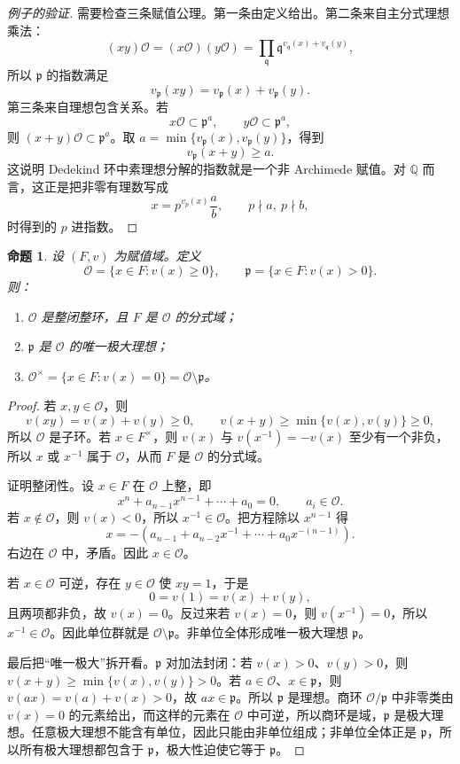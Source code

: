 \documentclass[11pt,a4paper,openany]{ctexbook}
\numberwithin{equation}{chapter}
\newcommand{\Q}{\mathbb{Q}}
\theoremstyle{plain}
\newtheorem{proposition}[theorem]{命题}
\theoremstyle{definition}
\theoremstyle{remark}
\begin{document}
\begin{proof}[例子的验证]
需要检查三条赋值公理。第一条由定义给出。第二条来自主分式理想乘法：
\[
(xy)\mathcal O=(x\mathcal O)(y\mathcal O)
=\prod_{\mathfrak q}\mathfrak q^{v_{\mathfrak q}(x)+v_{\mathfrak q}(y)},
\]
所以 $\mathfrak p$ 的指数满足
\[
v_{\mathfrak p}(xy)=v_{\mathfrak p}(x)+v_{\mathfrak p}(y).
\]
第三条来自理想包含关系。若
\[
x\mathcal O\subset \mathfrak p^a,\qquad y\mathcal O\subset \mathfrak p^a,
\]
则 $(x+y)\mathcal O\subset \mathfrak p^a$。取
$a=\min\{v_{\mathfrak p}(x),v_{\mathfrak p}(y)\}$，得到
\[
v_{\mathfrak p}(x+y)\ge a.
\]
这说明 Dedekind 环中素理想分解的指数就是一个非 Archimede 赋值。对
\(\Q\) 而言，这正是把非零有理数写成
\[
x=p^{v_p(x)}\frac ab,\qquad p\nmid a,\ p\nmid b,
\]
时得到的 $p$ 进指数。
\end{proof}

\begin{proposition}
设 $(F,v)$ 为赋值域。定义
\[
\mathcal O=\{x\in F:v(x)\ge0\},\qquad
\mathfrak p=\{x\in F:v(x)>0\}.
\]
则：
\begin{enumerate}[label=(\arabic*)]
\item $\mathcal O$ 是整闭整环，且 $F$ 是 $\mathcal O$ 的分式域；
\item $\mathfrak p$ 是 $\mathcal O$ 的唯一极大理想；
\item $\mathcal O^\times=\{x\in F:v(x)=0\}=\mathcal O\setminus\mathfrak p$。
\end{enumerate}
\end{proposition}

\begin{proof}
若 $x,y\in\mathcal O$，则
\[
v(xy)=v(x)+v(y)\ge0,\qquad
v(x+y)\ge\min\{v(x),v(y)\}\ge0,
\]
所以 $\mathcal O$ 是子环。若 $x\in F^\times$，则 $v(x)$ 与 $v(x^{-1})=-v(x)$ 至少有一个非负，所以 $x$ 或 $x^{-1}$ 属于 $\mathcal O$，从而 $F$ 是 $\mathcal O$ 的分式域。

证明整闭性。设 $x\in F$ 在 $\mathcal O$ 上整，即
\[
x^n+a_{n-1}x^{n-1}+\cdots+a_0=0,\qquad a_i\in\mathcal O.
\]
若 $x\notin\mathcal O$，则 $v(x)<0$，所以 $x^{-1}\in\mathcal O$。把方程除以 $x^{n-1}$ 得
\[
x=-(a_{n-1}+a_{n-2}x^{-1}+\cdots+a_0x^{-(n-1)}).
\]
右边在 $\mathcal O$ 中，矛盾。因此 $x\in\mathcal O$。

若 $x\in\mathcal O$ 可逆，存在 $y\in\mathcal O$ 使 $xy=1$，于是
\[
0=v(1)=v(x)+v(y),
\]
且两项都非负，故 $v(x)=0$。反过来若 $v(x)=0$，则 $v(x^{-1})=0$，所以 $x^{-1}\in\mathcal O$。因此单位群就是 $\mathcal O\setminus\mathfrak p$。非单位全体形成唯一极大理想 $\mathfrak p$。

最后把“唯一极大”拆开看。$\mathfrak p$ 对加法封闭：若 $v(x)>0$、$v(y)>0$，则
$v(x+y)\ge\min\{v(x),v(y)\}>0$。若 $a\in\mathcal O$、$x\in\mathfrak p$，则
$v(ax)=v(a)+v(x)>0$，故 $ax\in\mathfrak p$。所以 $\mathfrak p$ 是理想。商环
\(\mathcal O/\mathfrak p\) 中非零类由 $v(x)=0$ 的元素给出，而这样的元素在
\(\mathcal O\) 中可逆，所以商环是域，$\mathfrak p$ 是极大理想。任意极大理想不能含有单位，因此只能由非单位组成；非单位全体正是 $\mathfrak p$，所以所有极大理想都包含于
\(\mathfrak p\)，极大性迫使它等于 $\mathfrak p$。
\end{proof}
\end{document}
